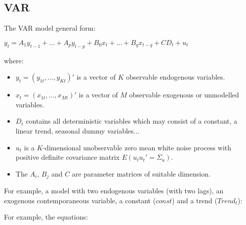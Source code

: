 \documentclass[10pt, a4paper, landscape]{extarticle}
\begin{document}
\begin{multicols}{3}
\section*{VAR}

The VAR model general form:

$y_t = A_1 y_{t-1} + ... + A_p y_{t-p} + B_0 x_t + ... + B_q x_{t-q} + CD_t + u_t$

where:

\begin{itemize}[leftmargin=*]
	\item $y_t = (y_{1t}, ..., y_{Kt})'$ is a vector of $K$ observable endogenous variables.
	\item $x_t = (x_{1t}, ..., x_{Mt})'$ is a vector of $M$ observable exogenous or unmodelled variables.
	\item $D_t$ contains all deterministic variables which may consist of a constant, a linear trend, seasonal dummy variables...
	\item $u_t$ is a $K$-dimensional unobservable zero mean white noise process with positive definite covariance matrix $E(u_t u_t' = \Sigma_u)$.
	\item The $A_i$, $B_j$ and $C$ are parameter matrices of suitable dimension.
\end{itemize}

For example, a model with two endogenous variables (with two lags), an exogenous contemporaneous variable, a constant ($const$) and a trend ($Trend_t$):



For example, the equations:



\end{multicols}
\end{document}
